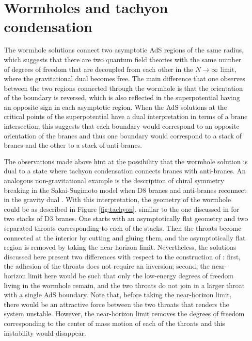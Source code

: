 \section{Wormholes and tachyon condensation}\label{sec:wormholes}

The wormhole solutions connect two asymptotic AdS regions of the same radius, which suggests that there are two quantum field theories with the same number of degrees of freedom that are decoupled from each other in the $N\to \infty$ limit, where the gravitational dual becomes free. The main difference that one observes between the two regions connected through the wormhole is that the orientation of the boundary is reversed, which is also reflected in the superpotential having an opposite sign in each asymptotic region. When the AdS solutions at the critical points of the superpotential have a dual interpretation in terms of a brane intersection, this suggests that each boundary would correspond to an opposite orientation of the branes and thus one boundary would correspond to a stack of branes and the other to a stack of anti-branes. 
 
The observations made above hint at the possibility that the wormhole solution is dual to a state where tachyon condensation connects branes with anti-branes. An analogous non-gravitational example is the description of chiral symmetry breaking in the Sakai-Sugimoto model when D8 branes and anti-branes reconnect in the gravity dual \cite{Sakai:2004cn,Casero:2007ae,Dhar:2007bz}. With this interpretation, the geometry of the wormhole could be as described in Figure \ref{fig:tachyon}, similar to the one discussed in \cite{Balasubramanian:2020ffd} for two stacks of D3 branes. One starts with an asymptotically flat geometry and two separated throats corresponding to each of the stacks. Then the throats become connected at the interior by cutting and gluing them, and the asymptotically flat region is removed by taking the near-horizon limit. Nevertheless, the solutions discussed here present two differences with respect to the construction of \cite{Balasubramanian:2020ffd}: first, the adhesion of the throats does not require an inversion; second, the near-horizon limit here would be such that only the low-energy degrees of freedom living in the wormhole remain, and the two throats do not join in a larger throat with a single AdS boundary. Note that, before taking the near-horizon limit, there would be an attractive force between the two throats that renders the system unstable. However, the near-horizon limit removes the degrees of freedom corresponding to the center of mass motion of each of the throats and this instability would disappear.

